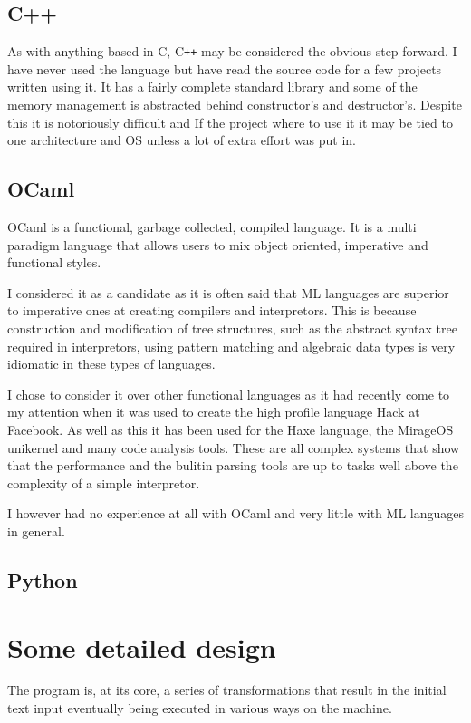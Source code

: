 \subsection{C++}


As with anything based in C, C\verb!++! may be considered the obvious step forward.
I have never used the language but have read the source code for a few projects written using it.
It has a fairly complete standard library and some of the memory management is abstracted behind constructor's and destructor's.
Despite this it is notoriously difficult and If the project where to use it it may be tied to one architecture and OS unless a lot of extra effort was put in.

\subsection{OCaml}
OCaml is a functional, garbage collected, compiled language.
It is a multi paradigm language that allows users to mix object oriented, imperative and functional styles.

I considered it as a candidate as it is often said that ML languages are superior to imperative ones at creating compilers and interpretors. 
This is because construction and modification of tree structures, such as the abstract syntax tree required in interpretors, using pattern matching and algebraic data types is very idiomatic in these types of languages.

I chose to consider it over other functional languages as it had recently come to my attention when it was used to create the high profile language Hack at Facebook.
As well as this it has been used for the Haxe language, the MirageOS unikernel and many code analysis tools.
These are all complex systems that show that the performance and the bulitin parsing tools are up to tasks well above the complexity of a simple interpretor.

I however had no experience at all with OCaml and very little with ML languages in general.



\subsection{Python}



\section{Some detailed design}
The program is, at its core, a series of transformations that result in the initial text input eventually being executed in various ways on the machine.

